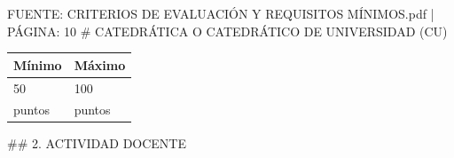 \documentclass{article}
\begin{document}
\begin{itemize}
\begin{itemize}
\begin{scriptsize}
                  FUENTE: CRITERIOS DE EVALUACIÓN Y REQUISITOS MÍNIMOS.pdf | PÁGINA: 10
                  \# CATEDRÁTICA O CATEDRÁTICO DE UNIVERSIDAD (CU)

                  \vspace{0.4cm}
                  \begin{table}[h!]\centering\renewcommand{\arraystretch}{1.3}
                    \begin{tabular}{|p{}|p{}|}\hline
                      Mínimo & Máximo \\\hline
                      50     & 100    \\\hline
                      puntos & puntos \\\hline
                    \end{tabular}\end{table}
                  \vspace{0.4cm}

                  \#\# 2. ACTIVIDAD DOCENTE


\end{scriptsize}
\end{itemize}
\end{itemize}
\end{document}
